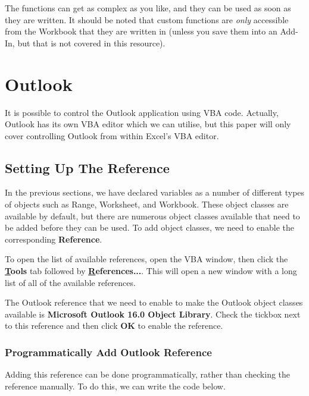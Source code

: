 \documentclass[11pt]{article}%
\begin{document}
The functions can get as complex as you like, and they can be used as soon as they are written. It should be noted that custom functions are \textit{only} accessible from the Workbook that they are written in (unless you save them into an Add-In, but that is not covered in this resource).


\section{Outlook}

It is possible to control the Outlook application using VBA code. Actually, Outlook has its own VBA editor which we can utilise, but this paper will only cover controlling Outlook from within Excel's VBA editor.


\subsection{Setting Up The Reference}

In the previous sections, we have declared variables as a number of different types of objects such as Range, Worksheet, and Workbook. These object classes are available by default, but there are numerous object classes available that need to be added before they can be used. To add object classes, we need to enable the corresponding \textbf{Reference}.

To open the list of available references, open the VBA window, then click the \textbf{\underline{T}ools} tab followed by \textbf{\underline{R}eferences...}. This will open a new window with a long list of all of the available references.

The Outlook reference that we need to enable to make the Outlook object classes available is \textbf{Microsoft Outlook 16.0 Object Library}. Check the tickbox next to this reference and then click \textbf{OK} to enable the reference.


\subsubsection{Programmatically Add Outlook Reference}

Adding this reference can be done programmatically, rather than checking the reference manually. To do this, we can write the code below.\\
\end{document}
